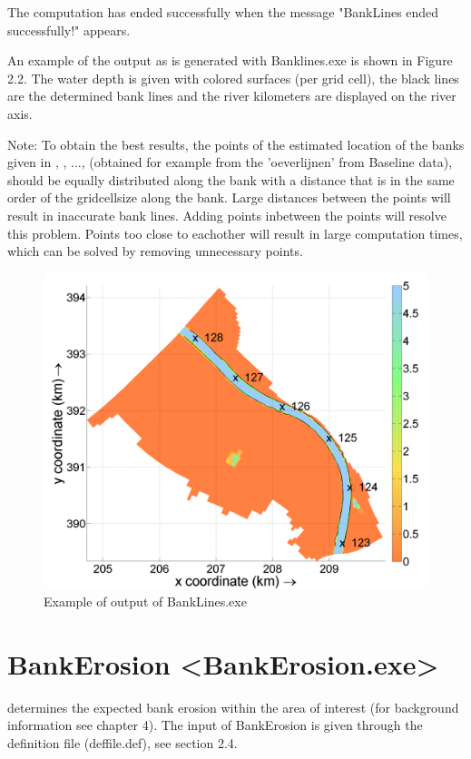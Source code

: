The computation has ended successfully when the message "BankLines ended successfully!" appears.

An example of the output as is generated with Banklines.exe is shown in Figure 2.2.
The water depth is given with colored surfaces (per grid cell), the black lines are the determined bank lines and the river kilometers are displayed on the river axis.

Note: To obtain the best results, the points of the estimated location of the banks given in  , , ...,  (obtained for example from the 'oeverlijnen' from Baseline data), should be equally distributed along the bank with a distance that is in the same order of the gridcellsize along the bank.
Large distances between the points will result in inaccurate bank lines.
Adding points inbetween the points will resolve this problem.
Points too close to eachother will result in large computation times, which can be solved by removing unnecessary points.

\begin{figure}
\includegraphics[width=\textwidth]{figures/Fig2-2.png}
\caption{Example of output of BankLines.exe}
\label{Fig2.2}
\end{figure}

\section{BankErosion <BankErosion.exe>}

determines the expected bank erosion within the area of interest (for background information see chapter 4).
The input of BankErosion  is given through the definition file (deffile.def), see section 2.4.

